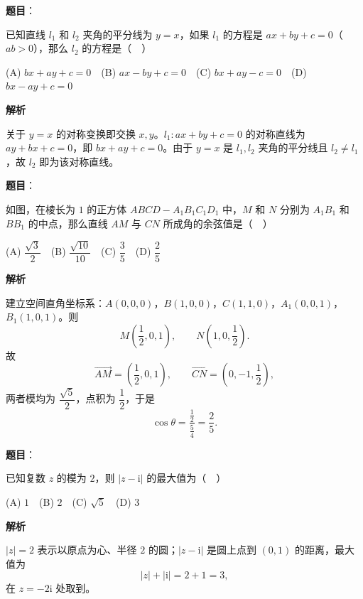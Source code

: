 \begin{answer}

\textbf{题目}：

已知直线 \(l_1\) 和 \(l_2\) 夹角的平分线为 \(y=x\)，如果 \(l_1\) 的方程是 \(ax+by+c=0\)（\(ab>0\)），那么 \(l_2\) 的方程是（　）

(A) \(bx+ay+c=0\)　(B) \(ax-by+c=0\)　(C) \(bx+ay-c=0\)　(D) \(bx-ay+c=0\)

\textbf{解析}

关于 \(y=x\) 的对称变换即交换 \(x,y\)。\(l_1:ax+by+c=0\) 的对称直线为 \(ay+bx+c=0\)，即 \(bx+ay+c=0\)。由于 \(y=x\) 是 \(l_1,l_2\) 夹角的平分线且 \(l_2\neq l_1\)，故 \(l_2\) 即为该对称直线。


\end{answer}
\begin{answer}

\textbf{题目}：

如图，在棱长为 \(1\) 的正方体 \(ABCD-A_1B_1C_1D_1\) 中，\(M\) 和 \(N\) 分别为 \(A_1B_1\) 和 \(BB_1\) 的中点，那么直线 \(AM\) 与 \(CN\) 所成角的余弦值是（　）
\nopagebreak[4]
\begin{center}\end{center}
\nopagebreak[4]
(A) \(\dfrac{\sqrt{3}}{2}\)　(B) \(\dfrac{\sqrt{10}}{10}\)　(C) \(\dfrac{3}{5}\)　(D) \(\dfrac{2}{5}\)

\textbf{解析}

建立空间直角坐标系：\(A(0,0,0)\)，\(B(1,0,0)\)，\(C(1,1,0)\)，\(A_1(0,0,1)\)，\(B_1(1,0,1)\)。则
\nopagebreak[4]
\[
M\left(\frac12,0,1\right),\qquad N\left(1,0,\frac12\right).
\]
故
\nopagebreak[4]
\[
\overrightarrow{AM}=\left(\frac12,0,1\right),\qquad
\overrightarrow{CN}=\left(0,-1,\frac12\right),
\]
两者模均为 \(\dfrac{\sqrt5}{2}\)，点积为 \(\dfrac12\)，于是
\nopagebreak[4]
\[
\cos\theta=\frac{\frac12}{\frac54}=\frac25.
\]


\end{answer}
\begin{answer}

\textbf{题目}：

已知复数 \(z\) 的模为 \(2\)，则 \(|z-\mathrm{i}|\) 的最大值为（　）

(A) \(1\)　(B) \(2\)　(C) \(\sqrt{5}\)　(D) \(3\)

\textbf{解析}

\(|z|=2\) 表示以原点为心、半径 \(2\) 的圆；\(|z-\mathrm{i}|\) 是圆上点到 \((0,1)\) 的距离，最大值为
\nopagebreak[4]
\[
|z|+|\mathrm{i}|=2+1=3,
\]
在 \(z=-2\mathrm{i}\) 处取到。


\end{answer}
